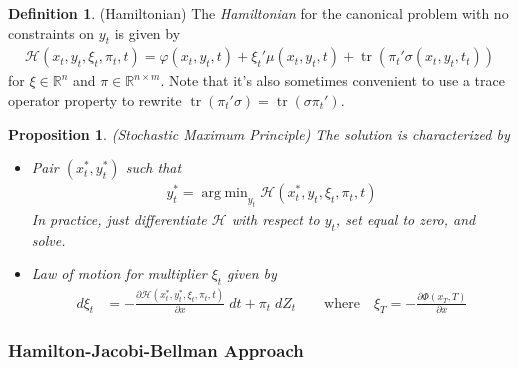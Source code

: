 \documentclass[12pt]{article}
\numberwithin{equation}{section} %
\theoremstyle{plain}
\newtheorem{prop}[thm]{Proposition}
\theoremstyle{definition}
\newtheorem{defn}[thm]{Definition}
\theoremstyle{remark}
\newcommand{\trace}{\operatorname{tr}}
\newcommand{\calH}{\mathcal{H}}
\newcommand{\R}{\mathbb{R}}
\DeclareMathOperator*{\argmin}{arg\;min}
\begin{document}
\begin{defn}(Hamiltonian)
The \emph{Hamiltonian} for the canonical problem with no constraints on
$y_t$ is given by
\begin{align*}
  \calH(x_t,y_t,\xi_t,\pi_t,t)
  =
  \varphi(x_t,y_t,t)
  +
  \xi_t'
  \mu(x_t,y_t,t)
  +
  \trace\left(
  \pi_t'
  \sigma(x_t,y_t,t_t)
  \right)
\end{align*}
for $\xi\in \R^n$ and $\pi\in\R^{n\times m}$.
Note that it's also sometimes convenient to use a trace operator
property to rewrite $\trace(\pi_t' \sigma) =\trace(\sigma\pi_t')$.
\end{defn}

\begin{prop}\emph{(Stochastic Maximum Principle)}
The solution is characterized by
\begin{itemize}
  \item
    Pair $(x_t^*,y_t^*)$ such that
    \begin{align*}
      y_t^*
      =
      \argmin_{y_t}
      \calH(x_t^*,y_t,\xi_t,\pi_t,t)
    \end{align*}
    In practice, just differentiate $\calH$ with respect to $y_t$,
    set equal to zero, and solve.

  \item Law of motion for multiplier $\xi_t$ given by
    \begin{align*}
      d\xi_t
      &=
      -\frac{\partial \calH(x_t^*,y_t^*,\xi_t,\pi_t,t)}{\partial x}
      \;dt
      +
      \pi_t
      \;dZ_t
      \qquad\text{where}\quad
      \xi_T
      =
      -\frac{\partial \Phi(x_T,T)}{\partial x}
    \end{align*}
\end{itemize}
\end{prop}


\clearpage
\subsubsection{Hamilton-Jacobi-Bellman Approach}
\end{document}
